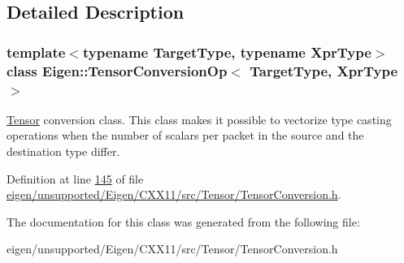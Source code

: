\subsection{Detailed Description}
\subsubsection*{template$<$typename Target\+Type, typename Xpr\+Type$>$\newline
class Eigen\+::\+Tensor\+Conversion\+Op$<$ Target\+Type, Xpr\+Type $>$}

\hyperlink{class_eigen_1_1_tensor}{Tensor} conversion class. This class makes it possible to vectorize type casting operations when the number of scalars per packet in the source and the destination type differ. 

Definition at line \hyperlink{eigen_2unsupported_2_eigen_2_c_x_x11_2src_2_tensor_2_tensor_conversion_8h_source_l00145}{145} of file \hyperlink{eigen_2unsupported_2_eigen_2_c_x_x11_2src_2_tensor_2_tensor_conversion_8h_source}{eigen/unsupported/\+Eigen/\+C\+X\+X11/src/\+Tensor/\+Tensor\+Conversion.\+h}.



The documentation for this class was generated from the following file\+:\begin{DoxyCompactItemize}
\item 
eigen/unsupported/\+Eigen/\+C\+X\+X11/src/\+Tensor/\+Tensor\+Conversion.\+h\end{DoxyCompactItemize}
